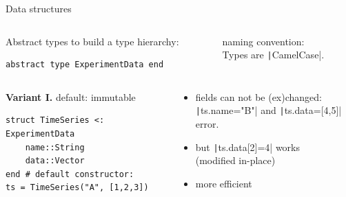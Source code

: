 \documentclass[aspectratio=169, 11pt, handout]{beamer}
\begin{document}
    \begin{frame}[fragile]{Data structures}
        \vspace{-.25\baselineskip}
        \begin{columns}[T]
            \begin{column}{.65\textwidth}
                \alert{Abstract types} to build a type hierarchy:
                \begin{verbatim}
abstract type ExperimentData end
                \end{verbatim}
            \end{column}
            \pause
            \begin{column}{.33\textwidth}
            \alert{naming convention:}\\ Types are
            \texttt|CamelCase|.
            \end{column}
        \end{columns}
        \vspace{\baselineskip}
        \pause
        \begin{columns}[T]
            \begin{column}{.49\textwidth}
                \textbf{Variant I.} default: immutable
                \begin{verbatim}
struct TimeSeries <: ExperimentData
    name::String
    data::Vector
end # default constructor:
ts = TimeSeries("A", [1,2,3])
                \end{verbatim}
            \end{column}
            \begin{column}{.5\textwidth}
                \vspace{-.25\baselineskip}
                \pause
                \begin{itemize}[<+->]
                    \item fields can not be (ex)changed:\\
                    \texttt|ts.name="B"| and
                    \texttt|ts.data=[4,5]| error.\\[.25\baselineskip]
                    \item\alert{but} \texttt|ts.data[2]=4| works
                    \\(modified in-place)
                    \item more efficient

\end{itemize}
\end{column}
\end{columns}
\end{frame}
\end{document}
